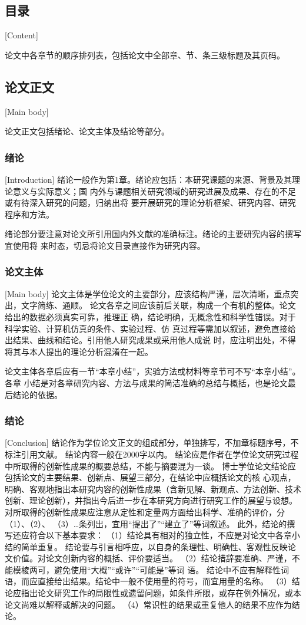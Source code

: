 \subsection{目录}[Content]

论文中各章节的顺序排列表，包括论文中全部章、节、条三级标题及其页码。

\subsection{论文正文}[Main body]

论文正文包括绪论、论文主体及结论等部分。

\subsubsection{绪论}[Introduction]
绪论一般作为第1章。绪论应包括：本研究课题的来源、背景及其理论意义与实际意义；国
内外与课题相关研究领域的研究进展及成果、存在的不足或有待深入研究的问题，归纳出将
要开展研究的理论分析框架、研究内容、研究程序和方法。

绪论部分要注意对论文所引用国内外文献的准确标注。绪论的主要研究内容的撰写宜使用将
来时态，切忌将论文目录直接作为研究内容。

\subsubsection{论文主体}[Main body]
论文主体是学位论文的主要部分，应该结构严谨，层次清晰，重点突出，文字简练、通顺。
论文各章之间应该前后关联，构成一个有机的整体。论文给出的数据必须真实可靠，推理正
确，结论明确，无概念性和科学性错误。对于科学实验、计算机仿真的条件、实验过程、仿
真过程等需加以叙述，避免直接给出结果、曲线和结论。引用他人研究成果或采用他人成说
时，应注明出处，不得将其与本人提出的理论分析混淆在一起。

论文主体各章后应有一节“本章小结”，实验方法或材料等章节可不写“本章小结”。各章
小结是对各章研究内容、方法与成果的简洁准确的总结与概括，也是论文最后结论的依据。

\subsubsection{结论}[Conclusion]
结论作为学位论文正文的组成部分，单独排写，不加章标题序号，不标注引用文献。
结论内容一般在\num{2000}字以内。
结论应是作者在学位论文研究过程中所取得的创新性成果的概要总结，不能与摘要混为一谈。
博士学位论文结论应包括论文的主要结果、创新点、展望三部分，在结论中应概括论文的核
心观点，明确、客观地指出本研究内容的创新性成果（含新见解、新观点、方法创新、技术
创新、理论创新），并指出今后进一步在本研究方向进行研究工作的展望与设想。
对所取得的创新性成果应注意从定性和定量两方面给出科学、准确的评价，分（1）、（2）、
（3）…条列出，宜用“提出了”“建立了”等词叙述。
此外，结论的撰写还应符合以下基本要求：
（1）结论具有相对的独立性，不应是对论文中各章小结的简单重复。
结论要与引言相呼应，以自身的条理性、明确性、客观性反映论文价值。对论文创新内容的概括、评价要适当。
（2）结论措辞要准确、严谨，不能模棱两可，避免使用“大概”“或许”“可能是”等词
语。
结论中不应有解释性词语，而应直接给出结果。结论中一般不使用量的符号，而宜用量的名称。
（3）结论应指出论文研究工作的局限性或遗留问题，如条件所限，或存在例外情况，或本论文尚难以解释或解决的问题。
（4）常识性的结果或重复他人的结果不应作为结论。

